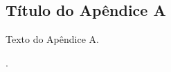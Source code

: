 
\begin{apendicesenv}
	
	
	\chapter{Título do Apêndice A}
	
	Texto do Apêndice A.
	
	.
		
	
\end{apendicesenv}
